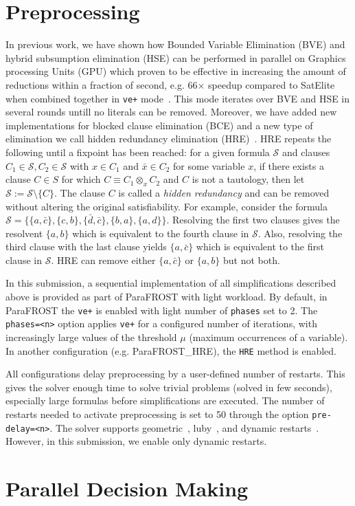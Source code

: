 \documentclass[conference]{IEEEtran}
\newcommand{\parafrost}{ParaFROST\xspace}
\newcommand{\parafrostHRE}{ParaFROST\_HRE\xspace}
\begin{document}
\section{Preprocessing}
In previous work, we have shown how Bounded Variable Elimination (BVE) and hybrid subsumption elimination (HSE) can be performed in parallel on Graphics processing Units (GPU) which proven to be effective in increasing the amount of reductions within a fraction of second, e.g. 66$\times$ speedup compared to SatElite when combined together in \texttt{ve+} mode~\cite{sigmaTacas}. This mode iterates over BVE and HSE in several rounds untill no literals can be removed. Moreover, we
have added new implementations for blocked clause elimination (BCE) and a new type
of elimination we call hidden redundancy elimination (HRE)~\cite{sigmaIfm}. HRE repeats the following until a fixpoint has been reached: for a given formula $\mathcal{S}$ and clauses $C_1\in\mathcal{S},C_2\in\mathcal{S}$ with $x\in C_1$ and $\bar{x}\in C_2$ for some variable $x$, if there exists a clause $C\in S$ for which $C\equiv C_1 \otimes_{x} C_2$ and $C$ is not a tautology, then let $\mathcal{S} := \mathcal{S} \setminus \{C\}$. The clause $C$ is called a \emph{hidden redundancy} and can be removed without altering the original satisfiability.
For example, consider the formula $\mathcal{S}=\{\{a,\bar{c}\},\{c,b\},\{\bar{d},\bar{c}\},\{b, a\},\{a,d\}\}$.
Resolving the first two clauses gives the resolvent $\{a,b\}$ which is equivalent to the fourth clause in $\mathcal{S}$. Also, resolving the third clause with the last clause yields $\{a,\bar{c}\}$ which is equivalent to the first clause in $\mathcal{S}$. HRE can remove either $\{a,\bar{c}\}$ or $\{a,b\}$ but not both.

In this submission, a sequential implementation of all simplifications described above is provided as part of \parafrost with light workload. By default, in \parafrost the \texttt{ve+} is enabled with light number of \texttt{phases} set to 2. The \texttt{phases=<n>} option applies \texttt{ve+} for a configured number of iterations, with increasingly large values of the threshold $\mu$ (maximum occurrences of a variable). In another configuration (e.g. \parafrostHRE), the \texttt{HRE} method is enabled.

All configurations delay preprocessing by a user-defined number of restarts. This gives the solver enough time to solve trivial problems (solved in few seconds), especially large formulas before simplifications are executed. The number of restarts needed to activate preprocessing is set to 50 through the option \texttt{pre-delay=<n>}. The solver supports geometric~\cite{geoRestart}, luby~\cite{minisat}, and dynamic restarts~\cite{dynamicRestarts}. However, in this submission, we enable only dynamic restarts.
%
%
\section{Parallel Decision Making}



\end{document}
